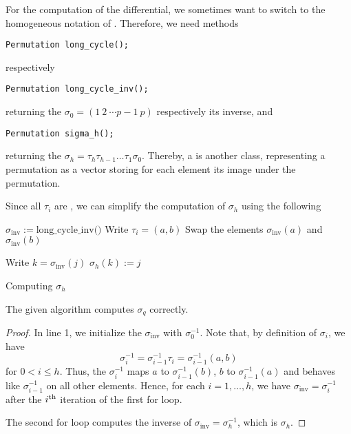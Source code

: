 For the computation of the differential, we sometimes want to switch to the homogeneous notation of . 
Therefore, we need methods
\begin{lstlisting}
Permutation long_cycle(); 
\end{lstlisting}
respectively
\begin{lstlisting}
Permutation long_cycle_inv();
\end{lstlisting}
returning the  $\sigma_0 = (1\ 2\ \dotsb p-1\ p)$ respectively its inverse, and
\begin{lstlisting}
Permutation sigma_h();
\end{lstlisting}
returning the  $\sigma_h = \tau_h \tau_{h-1} \dotsc \tau_1 \sigma_0$.
Thereby, a  is another class, representing a permutation as a vector
storing for each element its image under the permutation.

Since all $\tau_i$ are , 
we can simplify the computation of $\sigma_h$ using the following

\begin{algorithm}[H]
\label{sigma_q}
\DontPrintSemicolon


 $\sigma_{\text{inv}} := \text{long\_cycle\_inv()}$\;
{
	Write $\tau_i = (a, b)$\;
	Swap the elements $\sigma_{\text{inv}}(a)$ and $\sigma_{\text{inv}}(b)$\;
}

{
	Write $k = \sigma_{\text{inv}}(j)$\;
	$\sigma_h(k) := j$\;
}

\;

\caption{Computing $\sigma_h$}

\end{algorithm}

\begin{prop}
The given algorithm computes $\sigma_q$ correctly.
\begin{proof}
In line 1, we initialize the  $\sigma_{\text{inv}}$ with $\sigma_0^{-1}$. 
Note that, by definition of $\sigma_i$, we have
\[ \sigma_i^{-1} = \sigma_{i-1}^{-1} \tau_i = \sigma_{i-1}^{-1}  (a, b) \]
for $0 < i \leq h$. 
Thus, the  $\sigma_i^{-1}$ maps $a$ to $\sigma_{i-1}^{-1}(b)$, $b$ to $\sigma_{i-1}^{-1}(a)$ 
and behaves like $\sigma_{i-1}^{-1}$ on all other elements. 
Hence, for each $i = 1, \dotsc, h$, we have $\sigma_{\text{inv}} = \sigma_i^{-1}$ 
after the $i^{\text{th}}$ iteration of the first for loop. 

The second for loop computes the inverse of $\sigma_{\text{inv}} = \sigma_h^{-1}$, which is $\sigma_h$.
\end{proof}
\end{prop}

